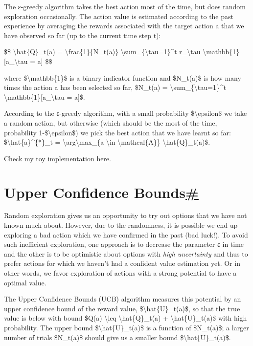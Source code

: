 The ε-greedy algorithm takes the best action most of the time, but does random exploration occasionally. The action value is estimated according to the past experience by averaging the rewards associated with the target action a that we have observed so far (up to the current time step t):

\$\$ \textbackslash hat\{Q\}\_t(a) = \textbackslash frac\{1\}\{N\_t(a)\} \textbackslash sum\_\{\textbackslash tau=1\}\^{}t r\_\textbackslash tau \textbackslash mathbb\{1\}{[}a\_\textbackslash tau = a{]} \$\$

where \$\textbackslash mathbb\{1\}\$ is a binary indicator function and \$N\_t(a)\$ is how many times the action a has been selected so far, \$N\_t(a) = \textbackslash sum\_\{\textbackslash tau=1\}\^{}t \textbackslash mathbb\{1\}{[}a\_\textbackslash tau = a{]}\$.

According to the ε-greedy algorithm, with a small probability \$\textbackslash epsilon\$ we take a random action, but otherwise (which should be the most of the time, probability 1-\$\textbackslash epsilon\$) we pick the best action that we have learnt so far: \$\textbackslash hat\{a\}\^{}\{*\}\_t = \textbackslash arg\textbackslash max\_\{a \textbackslash in \textbackslash mathcal\{A\}\} \textbackslash hat\{Q\}\_t(a)\$.

Check my toy implementation \href{https://github.com/lilianweng/multi-armed-bandit/blob/master/solvers.py\#L45}{here}.

\section{\texorpdfstring{Upper Confidence Bounds\hyperref[upper-confidence-bounds]{\#}}{Upper Confidence Bounds\#}}\label{upper-confidence-bounds}

Random exploration gives us an opportunity to try out options that we have not known much about. However, due to the randomness, it is possible we end up exploring a bad action which we have confirmed in the past (bad luck!). To avoid such inefficient exploration, one approach is to decrease the parameter ε in time and the other is to be optimistic about options with \emph{high uncertainty} and thus to prefer actions for which we haven't had a confident value estimation yet. Or in other words, we favor exploration of actions with a strong potential to have a optimal value.

The Upper Confidence Bounds (UCB) algorithm measures this potential by an upper confidence bound of the reward value, \$\textbackslash hat\{U\}\_t(a)\$, so that the true value is below with bound \$Q(a) \textbackslash leq \textbackslash hat\{Q\}\_t(a) + \textbackslash hat\{U\}\_t(a)\$ with high probability. The upper bound \$\textbackslash hat\{U\}\_t(a)\$ is a function of \$N\_t(a)\$; a larger number of trials \$N\_t(a)\$ should give us a smaller bound \$\textbackslash hat\{U\}\_t(a)\$.

